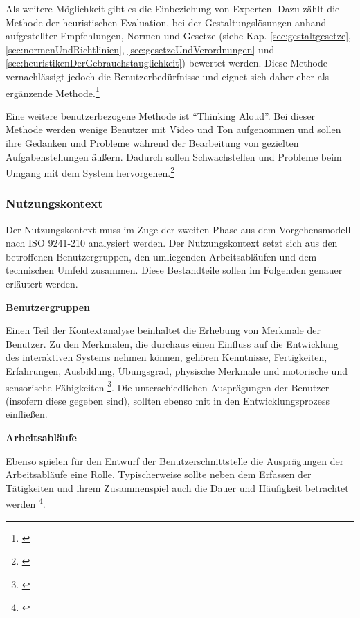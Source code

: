Als weitere Möglichkeit gibt es die Einbeziehung von Experten. Dazu zählt die Methode der heuristischen Evaluation, bei der Gestaltungslösungen anhand aufgestellter Empfehlungen, Normen und Gesetze (siehe Kap. \ref{sec:gestaltgesetze}, \ref{sec:normenUndRichtlinien}, \ref{sec:gesetzeUndVerordnungen} und \ref{sec:heuristikenDerGebrauchstauglichkeit}) bewertet werden. Diese Methode vernachlässigt jedoch die Benutzerbedürfnisse und eignet sich daher eher als ergänzende Methode.\footnote{\cite[vgl.][249]{Nielsen1990}}

Eine weitere benutzerbezogene Methode ist \enquote{Thinking Aloud}. Bei dieser Methode werden wenige Benutzer mit Video und Ton aufgenommen und sollen ihre Gedanken und Probleme während der Bearbeitung von gezielten Aufgabenstellungen äußern. Dadurch sollen Schwachstellen und Probleme beim Umgang mit dem System hervorgehen.\footnote{\cite[vgl.][51]{Hegner2003}}


\subsubsection{Nutzungskontext}
Der Nutzungskontext muss im Zuge der zweiten Phase aus dem Vorgehensmodell nach ISO 9241-210 analysiert werden. Der Nutzungskontext setzt sich aus den betroffenen Benutzergruppen, den umliegenden Arbeitsabläufen und dem technischen Umfeld zusammen. Diese Bestandteile sollen im Folgenden genauer erläutert werden.

\textbf{Benutzergruppen}

Einen Teil der Kontextanalyse beinhaltet die Erhebung von Merkmale der Benutzer. Zu den Merkmalen, die durchaus einen Einfluss auf die Entwicklung des interaktiven Systems nehmen können, gehören Kenntnisse, Fertigkeiten, Erfahrungen, Ausbildung, Übungsgrad, physische Merkmale und motorische und sensorische Fähigkeiten \footnote{\cite[vgl.][28]{Ecker2016}}. Die unterschiedlichen Ausprägungen der Benutzer (insofern diese gegeben sind), sollten ebenso mit in den Entwicklungsprozess einfließen.

\textbf{Arbeitsabläufe}

Ebenso spielen für den Entwurf der Benutzerschnittstelle die Ausprägungen der Arbeitsabläufe eine Rolle. Typischerweise sollte neben dem Erfassen der Tätigkeiten und ihrem Zusammenspiel auch die Dauer und Häufigkeit betrachtet werden \footnote{\cite[vgl.][28]{Ecker2016}}.

